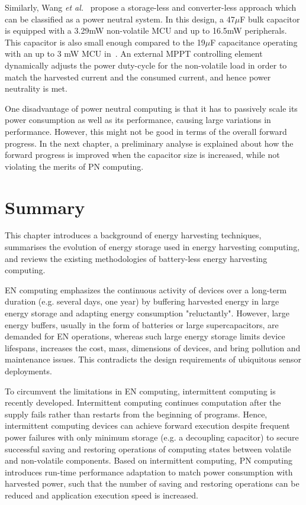 Similarly, Wang \textit{et al.}~\cite{wang2016storage} propose a storage-less and converter-less approach which can be classified as a power neutral system. In this design, a 47$\mu$F bulk capacitor is equipped with a 3.29mW non-volatile MCU and up to 16.5mW peripherals. This capacitor is also small enough compared to the 19$\mu$F capacitance operating with an up to 3 mW MCU in~\cite{balsamo2016graceful}. An external MPPT controlling element dynamically adjusts the power duty-cycle for the non-volatile load in order to match the harvested current and the consumed current, and hence power neutrality is met. 

One disadvantage of power neutral computing is that it has to passively scale its power consumption as well as its performance, causing large variations in performance. However, this might not be good in terms of the overall forward progress. In the next chapter, a preliminary analyse is explained about how the forward progress is improved when the capacitor size is increased, while not violating the merits of PN computing. 

\section{Summary}

This chapter introduces a background of energy harvesting techniques, summarises the evolution of energy storage used in energy harvesting computing, and reviews the existing methodologies of battery-less energy harvesting computing. 

EN computing emphasizes the continuous activity of devices over a long-term duration (e.g. several days, one year) by buffering harvested energy in large energy storage and adapting energy consumption "reluctantly". However, large energy buffers, usually in the form of batteries or large supercapacitors, are demanded for EN operations, whereas such large energy storage limits device lifespans, increases the cost, mass, dimensions of devices, and bring pollution and maintenance issues. This contradicts the design requirements of ubiquitous sensor deployments. 

To circumvent the limitations in EN computing, intermittent computing is recently developed. Intermittent computing continues computation after the supply fails rather than restarts from the beginning of programs. Hence, intermittent computing devices can achieve forward execution despite frequent power failures with only minimum storage (e.g. a decoupling capacitor) to secure successful saving and restoring operations of computing states between volatile and non-volatile components. Based on intermittent computing, PN computing introduces run-time performance adaptation to match power consumption with harvested power, such that the number of saving and restoring operations can be reduced and application execution speed is increased. 


